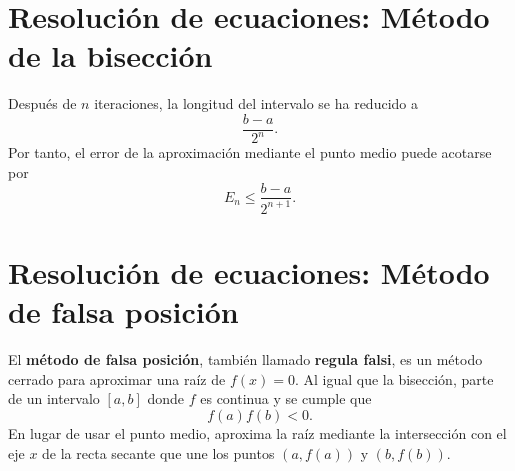 \documentclass[a4,11pt]{aleph-notas}
\begin{document}
\encabezado


\section{Resolución de ecuaciones: Método de la bisección}

\begin{defi}
    Después de $n$ iteraciones, la longitud del intervalo se ha reducido a
    \[
        \frac{b-a}{2^n}.
    \]
    Por tanto, el error de la aproximación mediante el punto medio puede acotarse por
    \[
        E_n \leq \frac{b-a}{2^{n+1}}.
    \]
\end{defi}

\begin{pscodigo}
\begin{function}[H]
\end{function}
\end{pscodigo}

\section{Resolución de ecuaciones: Método de falsa posición}

\begin{defi}
    El \textbf{método de falsa posición}, también llamado \textbf{regula falsi}, es un método cerrado para aproximar una raíz de $f(x)=0$. Al igual que la bisección, parte de un intervalo $[a,b]$ donde $f$ es continua y se cumple que
    \[
        f(a)f(b)<0.
    \]
    En lugar de usar el punto medio, aproxima la raíz mediante la intersección con el eje $x$ de la recta secante que une los puntos $(a,f(a))$ y $(b,f(b))$.
\end{defi}
\end{document}
